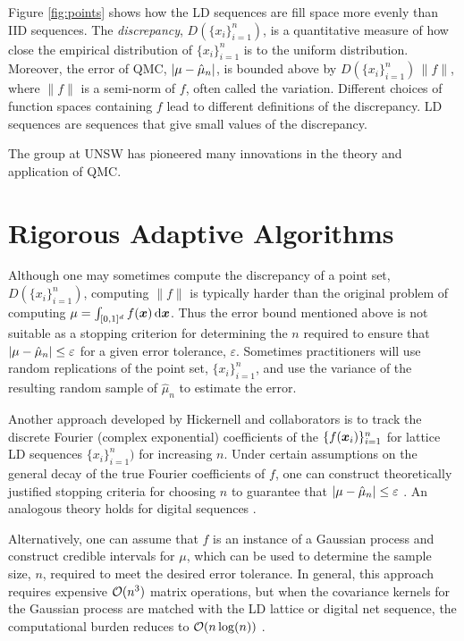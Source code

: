 \documentclass{amsart}
\begin{document}
Figure \ref{fig:points} shows how the LD sequences are fill space more evenly than IID sequences.  The \emph{discrepancy}, $D(\{x_i\}_{i=1}^n)$,  \cite{Hic97a,Hic99a} is a quantitative measure of how close the empirical distribution of $\{x_i\}_{i=1}^n$ is to the uniform distribution.  Moreover, the error of QMC, $\lvert \mu - \hat{\mu}_n\rvert$, is bounded above by $D(\{x_i\}_{i=1}^n) \, \lVert f\rVert$, where  $\lVert f\rVert$ is a semi-norm of $f$, often called the variation.  Different choices of function spaces containing $f$ lead to different definitions of the discrepancy.  LD sequences are sequences that give small values of the discrepancy.

The group at UNSW has pioneered many innovations in the theory and application of QMC.

\section{Rigorous Adaptive Algorithms}
Although one may sometimes compute the discrepancy of a point set, $D(\{x_i\}_{i=1}^n)$, computing $\lVert f\rVert$ is typically harder than the original problem of computing $\mu=\int_{[0,1]^d} f(\boldsymbol{x}) \, {\rm d} \boldsymbol{x}$.  Thus the error bound mentioned above is not suitable as a stopping criterion for determining the $n$ required to ensure that $\left \lvert \mu - \hat{\mu}_n \right \rvert \le \varepsilon$ for a given error tolerance, $\varepsilon$.  Sometimes practitioners will use random replications of the point set, $\{x_i\}_{i=1}^n$, and use the variance of the resulting random sample of $\hat{\mu}_n$ to estimate the error.

Another approach developed by Hickernell and collaborators is to track the discrete Fourier (complex exponential) coefficients of the $\{f(\boldsymbol{x}_i)\}_{i=1}^n$ for lattice LD sequences $\{x_i\}_{i=1}^n)$ for increasing $n$.  Under certain assumptions on the general decay of the true Fourier coefficients of $f$, one can construct theoretically justified stopping criteria for choosing $n$ to guarantee that $\left \lvert \mu - \hat{\mu}_n \right \rvert \le \varepsilon$ \cite{JimHic16a}.  An analogous theory holds for digital sequences \cite{HicJim16a}.

Alternatively, one can assume that $f$ is an instance of a Gaussian process and construct credible intervals for $\mu$, which can be used to determine the sample size, $n$, required to meet the desired error tolerance.  In general, this approach requires expensive $\operatorname{{\mathcal O}}(n^3)$ matrix operations, but when the covariance kernels for the Gaussian process are matched with the LD lattice or digital net sequence, the computational burden reduces  to $\operatorname{{\mathcal O}}(n \log(n))$ \cite{RatHic19a,JagHic22a}.
\end{document}
